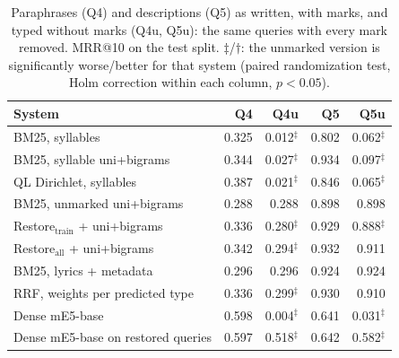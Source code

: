 \begin{table}[t]
\centering
\caption{Paraphrases (Q4) and descriptions (Q5) as written, with marks, and typed without marks (Q4u, Q5u):
the same queries with every mark removed. MRR@10 on the test split. $\ddagger$/$\dagger$: the unmarked
version is significantly worse/better for that system (paired randomization test, Holm correction within
each column, $p<0.05$).}
\label{tab:unmarked}
\small
\begin{tabular}{@{}lrrrr@{}}
\toprule
System & Q4 & Q4u & Q5 & Q5u \\
\midrule
BM25, syllables & 0.325 & 0.012$^{\ddagger}$ & 0.802 & 0.062$^{\ddagger}$ \\
BM25, syllable uni+bigrams & 0.344 & 0.027$^{\ddagger}$ & 0.934 & 0.097$^{\ddagger}$ \\
QL Dirichlet, syllables & 0.387 & 0.021$^{\ddagger}$ & 0.846 & 0.065$^{\ddagger}$ \\
BM25, unmarked uni+bigrams & 0.288 & 0.288 & 0.898 & 0.898 \\
Restore$_{\mathrm{train}}$ + uni+bigrams & 0.336 & 0.280$^{\ddagger}$ & 0.929 & 0.888$^{\ddagger}$ \\
Restore$_{\mathrm{all}}$ + uni+bigrams & 0.342 & 0.294$^{\ddagger}$ & 0.932 & 0.911 \\
BM25, lyrics + metadata & 0.296 & 0.296 & 0.924 & 0.924 \\
RRF, weights per predicted type & 0.336 & 0.299$^{\ddagger}$ & 0.930 & 0.910 \\
Dense mE5-base & 0.598 & 0.004$^{\ddagger}$ & 0.641 & 0.031$^{\ddagger}$ \\
Dense mE5-base on restored queries & 0.597 & 0.518$^{\ddagger}$ & 0.642 & 0.582$^{\ddagger}$ \\
\bottomrule
\end{tabular}
\end{table}
